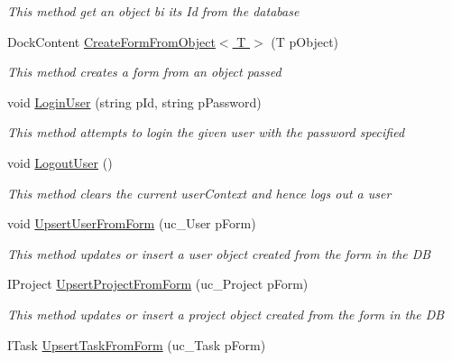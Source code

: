 \begin{DoxyCompactItemize}
\begin{DoxyCompactList}\small\item\em This method get an object bi its Id from the database \end{DoxyCompactList}\item 
Dock\+Content \hyperlink{class_plex_byte_1_1_mo_cap_1_1_managers_1_1_object_manager_a7d3b341d64d885e1671f8a493784863b}{Create\+Form\+From\+Object$<$ T $>$} (T p\+Object)
\begin{DoxyCompactList}\small\item\em This method creates a form from an object passed \end{DoxyCompactList}\item 
void \hyperlink{class_plex_byte_1_1_mo_cap_1_1_managers_1_1_object_manager_a5085b52777f11ac46c212048e72c52a2}{Login\+User} (string p\+Id, string p\+Password)
\begin{DoxyCompactList}\small\item\em This method attempts to login the given user with the password specified \end{DoxyCompactList}\item 
void \hyperlink{class_plex_byte_1_1_mo_cap_1_1_managers_1_1_object_manager_a859192e75ff6a9ab8d4be9c861697827}{Logout\+User} ()
\begin{DoxyCompactList}\small\item\em This method clears the current user\+Context and hence logs out a user \end{DoxyCompactList}\item 
void \hyperlink{class_plex_byte_1_1_mo_cap_1_1_managers_1_1_object_manager_ab1fc919983bb8b01c1da5fda95d87b9a}{Upsert\+User\+From\+Form} (uc\+\_\+\+User p\+Form)
\begin{DoxyCompactList}\small\item\em This method updates or insert a user object created from the form in the DB \end{DoxyCompactList}\item 
I\+Project \hyperlink{class_plex_byte_1_1_mo_cap_1_1_managers_1_1_object_manager_af46a31934758325e4fab19d4452a17d0}{Upsert\+Project\+From\+Form} (uc\+\_\+\+Project p\+Form)
\begin{DoxyCompactList}\small\item\em This method updates or insert a project object created from the form in the DB \end{DoxyCompactList}\item 
I\+Task \hyperlink{class_plex_byte_1_1_mo_cap_1_1_managers_1_1_object_manager_a86623ed9c02e9a5afbadeb2d9bdd4b3b}{Upsert\+Task\+From\+Form} (uc\+\_\+\+Task p\+Form)

\end{DoxyCompactItemize}
